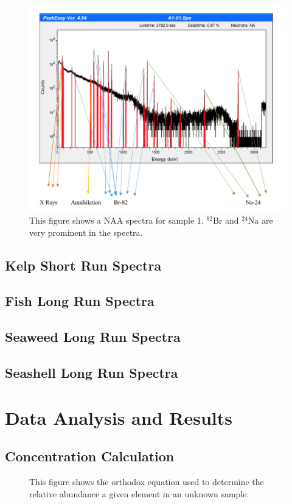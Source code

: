 \documentclass[]{article}
\begin{document}
\begin{figure}[h]
\centering
\includegraphics[scale=0.5]{ExampleSpectra}
\caption{This figure shows a NAA spectra for sample 1. $^{82}$Br and $^{24}$Na are very prominent in the spectra.}
\end{figure} 

\subsection{Kelp Short Run Spectra}
\subsection{Fish Long Run Spectra}
\subsection{Seaweed Long Run Spectra}
\subsection{Seashell Long Run Spectra}
\pagebreak


\section{Data Analysis and Results}
\subsection{Concentration Calculation}

\begin{figure}[h]
\centering
{}
\caption{This figure shows the orthodox equation used to determine the relative abundance a given element in an unknown sample.}
\end{figure}
\end{document}
